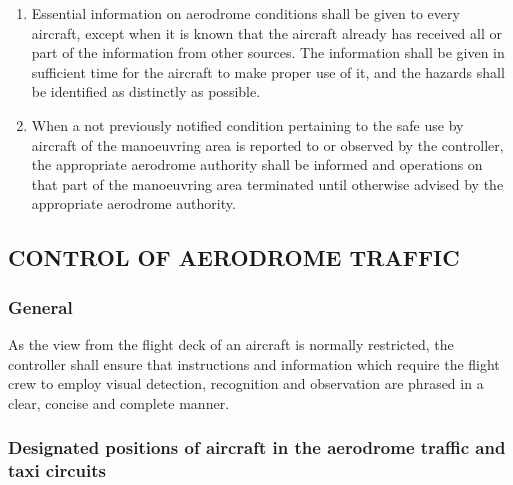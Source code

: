 \begin{enumerate}[label=\arabic{section}.\arabic{subsection}.\arabic*]

    \item Essential information on aerodrome conditions shall be given to every aircraft, except when it is known that the aircraft already has received all or part of the information from other sources. The information shall be given in sufficient time for the aircraft to make proper use of it, and the hazards shall be identified as distinctly as possible.


    \item When a not previously notified condition pertaining to the safe use by aircraft of the manoeuvring area is reported to or observed by the controller, the appropriate aerodrome authority shall be informed and operations on that part of the manoeuvring area terminated until otherwise advised by the appropriate aerodrome authority.
\end{enumerate}

\subsection[Control of aerodrome traffic]{CONTROL OF AERODROME TRAFFIC}

\subsubsection{General}

As the view from the flight deck of an aircraft is normally restricted, the controller shall ensure that instructions and information which require the flight crew to employ visual detection, recognition and observation are phrased in a clear, concise and complete manner.

\subsubsection{Designated positions of aircraft in the aerodrome traffic and taxi circuits} \label{7.6.2}

